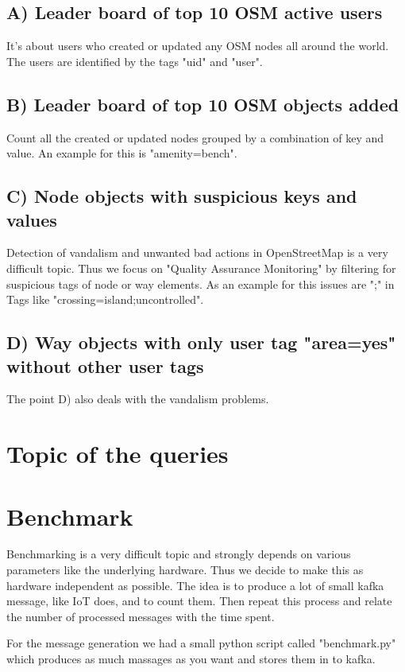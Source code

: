 \subsection{A) Leader board of top 10 OSM active users}
It's about users who created or updated any OSM nodes all around the world.
The users are identified by the tags "uid" and "user".

\subsection{B) Leader board of top 10 OSM objects added}
Count all the created or updated nodes grouped by a combination of key and value.
An example for this is "amenity=bench".

\subsection{C) Node objects with suspicious keys and values}
Detection of vandalism and unwanted bad actions in OpenStreetMap is a very difficult topic.
Thus we focus on "Quality Assurance Monitoring" by filtering for suspicious tags of node or way elements.
As an example for this issues are ";" in Tags like "crossing=island;uncontrolled".

\subsection{D) Way objects with only user tag "area=yes" without other user tags}
The point D) also deals with the vandalism problems.


\newpage
\section{Topic of the queries}


\newpage
\section{Benchmark}

Benchmarking is a very difficult topic and strongly depends on various parameters like the underlying hardware.
Thus we decide to make this as hardware independent as possible.
The idea is to produce a lot of small kafka message, like IoT does,
and to count them. Then repeat this process and relate the number of processed messages with the time spent.

For the message generation we had a small python script called "benchmark.py" which produces as much massages as you want
and stores them in to kafka.

